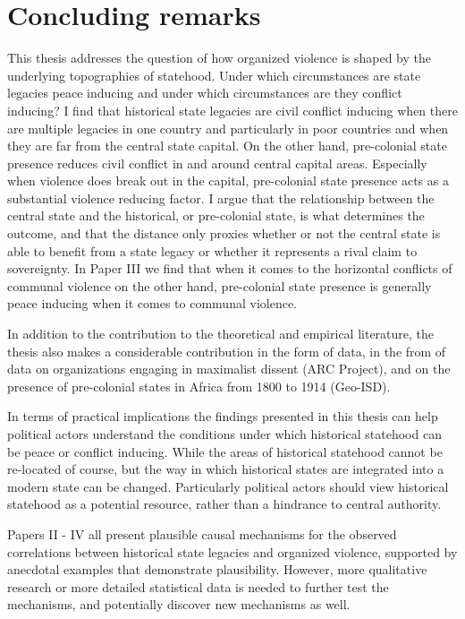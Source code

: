 \section{Concluding remarks} \label{Concluding remarks}

This thesis addresses the question of how organized violence is shaped by the
underlying topographies of statehood. Under which circumstances are state
legacies peace inducing and under which circumstances are they conflict
inducing? I find that historical state legacies are civil conflict inducing when
there are multiple legacies in one country and particularly in poor countries
and when they are far from the central state capital. On the other hand,
pre-colonial state presence reduces civil conflict in and around central capital
areas. Especially when violence does break out in the capital, pre-colonial
state presence acts as a substantial violence reducing factor. I argue that the
relationship between the central state and the historical, or pre-colonial
state, is what determines the outcome, and that the distance only proxies
whether or not the central state is able to benefit from a state legacy or
whether it represents a rival claim to sovereignty. In Paper III we find that
when it comes to the horizontal conflicts of communal violence on the other
hand, pre-colonial state presence is generally peace inducing when it comes to
communal violence.

In addition to the contribution to the theoretical and empirical literature, the
thesis also makes a considerable contribution in the form of data, in the from
of data on organizations engaging in maximalist dissent (ARC Project), and on
the presence of pre-colonial states in Africa from 1800 to 1914 (Geo-ISD). 

In terms of practical implications the findings presented in this thesis can help
political actors understand the conditions under which historical statehood can
be peace or conflict inducing. While the areas of historical statehood cannot be
re-located of course, but the way in which historical states are integrated into a
modern state can be changed. Particularly political actors should view
historical statehood as a potential resource, rather than a hindrance to central
authority.

Papers II - IV all present plausible causal mechanisms for the observed
correlations between historical state legacies and organized violence, supported
by anecdotal examples that demonstrate plausibility. However, more qualitative
research or more detailed statistical data is needed to further test the
mechanisms, and potentially discover new mechanisms as well.

